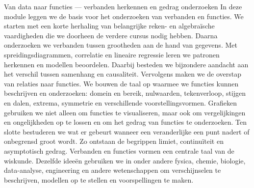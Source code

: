
\ifdefined\HCode
\else
  \FVDmoduleopening
    {Van data naar functies — verbanden herkennen en gedrag onderzoeken}
    {In deze module leggen we de basis voor het onderzoeken van verbanden en functies. We starten met een korte herhaling van belangrijke reken- en algebraïsche vaardigheden die we doorheen de verdere cursus nodig hebben. Daarna onderzoeken we verbanden tussen grootheden aan de hand van gegevens. Met spreidingsdiagrammen, correlatie en lineaire regressie leren we patronen herkennen en modellen beoordelen. Daarbij besteden we bijzondere aandacht aan het verschil tussen samenhang en causaliteit. Vervolgens maken we de overstap van relaties naar functies. We bouwen de taal op waarmee we functies kunnen beschrijven en onderzoeken: domein en bereik, nulwaarden, tekenverloop, stijgen en dalen, extrema, symmetrie en verschillende voorstellingsvormen. Grafieken gebruiken we niet alleen om functies te visualiseren, maar ook om vergelijkingen en ongelijkheden op te lossen en om het gedrag van functies te onderzoeken. Ten slotte bestuderen we wat er gebeurt wanneer een veranderlijke een punt nadert of onbegrensd groot wordt. Zo ontstaan de begrippen limiet, continuïteit en asymptotisch gedrag. Verbanden en functies vormen een centrale taal van de wiskunde. Dezelfde ideeën gebruiken we in onder andere fysica, chemie, biologie, data-analyse, engineering en andere wetenschappen om verschijnselen te beschrijven, modellen op te stellen en voorspellingen te maken.}
    {%
    }
\fi
